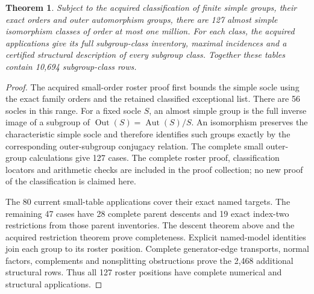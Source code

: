 \documentclass[11pt]{article}
\newtheorem{theorem}{Theorem}\newtheorem{proposition}[theorem]{Proposition}
\begin{document}
\begin{theorem}
Subject to the acquired classification of finite simple groups, their exact
orders and outer automorphism groups, there are 127 almost simple
isomorphism classes of order at most one million. For each class, the
acquired applications give its full subgroup-class inventory, maximal
incidences and a certified structural description of every subgroup class.
Together these tables contain 10,694 subgroup-class rows.
\end{theorem}
\begin{proof}
The acquired small-order roster proof first bounds the simple socle using
the exact family orders and the retained classified exceptional list.
There are 56 socles in this range. For a fixed socle $S$, an almost simple
group is the full inverse image of a subgroup of
$\operatorname{Out}(S)=\operatorname{Aut}(S)/S$. An isomorphism preserves
the characteristic simple socle and therefore identifies such groups
exactly by the corresponding outer-subgroup conjugacy relation. The complete
small outer-group calculations give 127 cases. The complete roster proof,
classification locators and arithmetic checks are included in the proof
collection; no new proof of the classification is claimed here.

The 80 current small-table applications cover their exact named targets.
The remaining 47 cases have 28 complete parent descents and 19 exact
index-two restrictions from those parent inventories. The descent theorem
above and the acquired restriction theorem prove completeness. Explicit
named-model identities join each group to its roster position. Complete
generator-edge transports, normal factors, complements and nonsplitting
obstructions prove the 2,468 additional structural rows. Thus all 127
roster positions have complete numerical and structural applications.
\end{proof}
\end{document}
